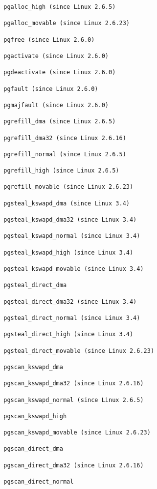 \documentclass[]{article}
\begin{document}
\begin{verbatim}
              pgalloc_high (since Linux 2.6.5)

              pgalloc_movable (since Linux 2.6.23)

              pgfree (since Linux 2.6.0)

              pgactivate (since Linux 2.6.0)

              pgdeactivate (since Linux 2.6.0)

              pgfault (since Linux 2.6.0)

              pgmajfault (since Linux 2.6.0)

              pgrefill_dma (since Linux 2.6.5)

              pgrefill_dma32 (since Linux 2.6.16)

              pgrefill_normal (since Linux 2.6.5)

              pgrefill_high (since Linux 2.6.5)

              pgrefill_movable (since Linux 2.6.23)

              pgsteal_kswapd_dma (since Linux 3.4)

              pgsteal_kswapd_dma32 (since Linux 3.4)

              pgsteal_kswapd_normal (since Linux 3.4)

              pgsteal_kswapd_high (since Linux 3.4)

              pgsteal_kswapd_movable (since Linux 3.4)

              pgsteal_direct_dma

              pgsteal_direct_dma32 (since Linux 3.4)

              pgsteal_direct_normal (since Linux 3.4)

              pgsteal_direct_high (since Linux 3.4)

              pgsteal_direct_movable (since Linux 2.6.23)

              pgscan_kswapd_dma

              pgscan_kswapd_dma32 (since Linux 2.6.16)

              pgscan_kswapd_normal (since Linux 2.6.5)

              pgscan_kswapd_high

              pgscan_kswapd_movable (since Linux 2.6.23)

              pgscan_direct_dma

              pgscan_direct_dma32 (since Linux 2.6.16)

              pgscan_direct_normal


\end{verbatim}
\end{document}
